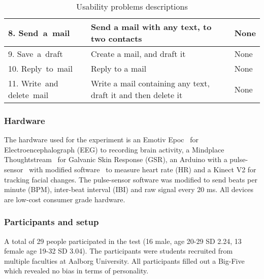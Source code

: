 \begin{table}[h]
\begin{tabular}[c]{|p{60pt}|p{80pt}|p{80pt}|}
    \small{8. Send~a~mail}            & \small{Send a mail with any text, to two contacts}                                                                             & \small{None}                                                                                             \\ \hline
    \small{9. Save~a~draft}           & \small{Create a mail, and draft it}                                                                                            & \small{None}                                                                                             \\ \hline
    \small{10. Reply~to~mail}         & \small{Reply to a mail}                                                                                                        & \small{None}                                                                                             \\ \hline
    \small{11. Write~and delete~mail} & \small{Write a mail containing any text, draft it and then delete it}                                                          & \small{None}                                                                                             \\ \hline
  \end{tabular}
  \caption{Usability problems descriptions}
  \label{tab:ups-desc}
\end{table}

\subsubsection{Hardware}
The hardware used for the experiment is an Emotiv Epoc~\cite{emotiv_epoc_website} for Electroencephalograph (EEG) to recording brain activity, a Mindplace Thoughtstream~\cite{thoughtstream} for Galvanic Skin Response (GSR), an Arduino with a pulse-sensor~\cite{pulsesensor} with modified software~\cite{pulsesensorgit} to measure heart rate (HR) and a Kinect V2\cite{kinect_specs3} for tracking facial changes.
The pulse-sensor software was modified to send beats per minute (BPM), inter-beat interval (IBI) and raw signal every 20 ms.
All devices are low-cost consumer grade hardware.

\subsubsection{Participants and setup}
A total of 29 people participated in the test (16 male, age 20-29 SD 2.24, 13 female age 19-32 SD 3.04).
The participants were students recruited from multiple faculties at Aalborg University. 
All participants filled out a Big-Five\cite{big5} which revealed no bias in terms of personality.

